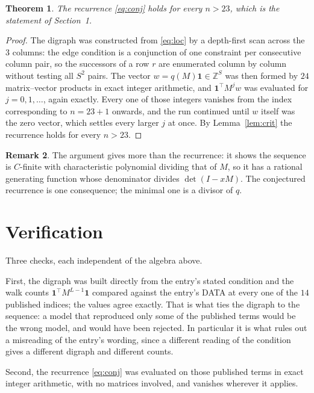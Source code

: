 \documentclass[11pt,a4paper]{article}
\theoremstyle{plain}
\newtheorem{theorem}{Theorem}
\theoremstyle{definition}
\newtheorem{remark}[theorem]{Remark}
\begin{document}
\begin{theorem}
The recurrence \eqref{eq:conj} holds for every $n>23$, which is the statement of
Section~1.
\end{theorem}

\begin{proof}
The digraph was constructed from \eqref{eq:loc} by a depth-first scan across the $3$
columns: the edge condition is a conjunction of one constraint per consecutive column
pair, so the successors of a row $r$ are enumerated column by column without testing all
$S^2$ pairs. The vector $w=q(M)\mathbf{1}\in\mathbb{Z}^{S}$ was then formed by $24$
matrix--vector products in exact integer arithmetic, and $\mathbf{1}^{\!\top}M^{j}w$ was
evaluated for $j=0,1,\dots$, again exactly. Every one of those integers vanishes from the
index corresponding to $n=23+1$ onwards, and the run continued until $w$ itself was the
zero vector, which settles every larger $j$ at once. By Lemma~\ref{lem:crit} the recurrence
holds for every $n>23$.
\end{proof}

\begin{remark}
The argument gives more than the recurrence: it shows the sequence is $C$-finite with
characteristic polynomial dividing that of $M$, so it has a rational generating function
whose denominator divides $\det(I-xM)$. The conjectured recurrence is one consequence; the
minimal one is a divisor of $q$.
\end{remark}

\section{Verification}

Three checks, each independent of the algebra above.

First, the digraph was built directly from the entry's stated condition and the walk counts
$\mathbf{1}^{\!\top}M^{L-1}\mathbf{1}$ compared against the entry's DATA at
every one of the $14$ published indices; the values agree exactly. That is what ties
the digraph to the sequence: a model that reproduced only some of the published terms would
be the wrong model, and would have been rejected. In particular it is what rules out a
misreading of the entry's wording, since a different reading of the condition gives a
different digraph and different counts.

Second, the recurrence \eqref{eq:conj} was evaluated on those published terms in exact
integer arithmetic, with no matrices involved, and vanishes wherever it applies.
\end{document}

